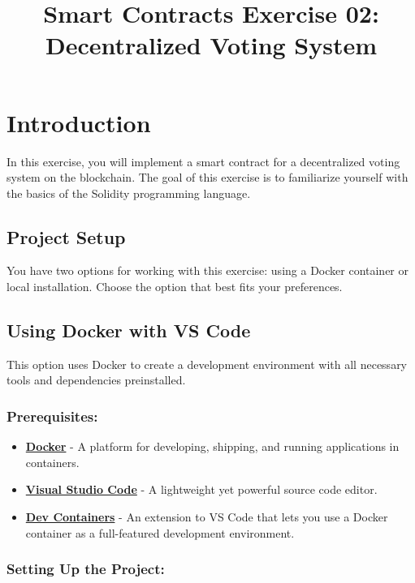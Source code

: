 \documentclass[12pt]{article}
\title{Smart Contracts Exercise 02: \\ Decentralized Voting System}
\author{}
\date{}
\begin{document}
\maketitle
\section{Introduction}

In this exercise, you will implement a smart contract for a decentralized voting system on the blockchain. The goal of this exercise is to familiarize yourself with the basics of the Solidity programming language.

\subsection*{Project Setup}

You have two options for working with this exercise: using a Docker container or local installation. Choose the option that best fits your preferences.

\subsection{Using Docker with VS Code}

This option uses Docker to create a development environment with all necessary tools and dependencies preinstalled.

\subsubsection*{Prerequisites:}

\begin{itemize}
    \item \textbf{\href{https://www.docker.com/products/docker-desktop}{Docker}} - A platform for developing, shipping, and running applications in containers.
    \item \textbf{\href{https://code.visualstudio.com/}{Visual Studio Code}} - A lightweight yet powerful source code editor.
    \item \textbf{\href{https://marketplace.visualstudio.com/items?itemName=ms-vscode-remote.remote-containers}{Dev Containers}} - An extension to VS Code that lets you use a Docker container as a full-featured development environment.
\end{itemize}

\subsubsection*{Setting Up the Project:}
\end{document}
